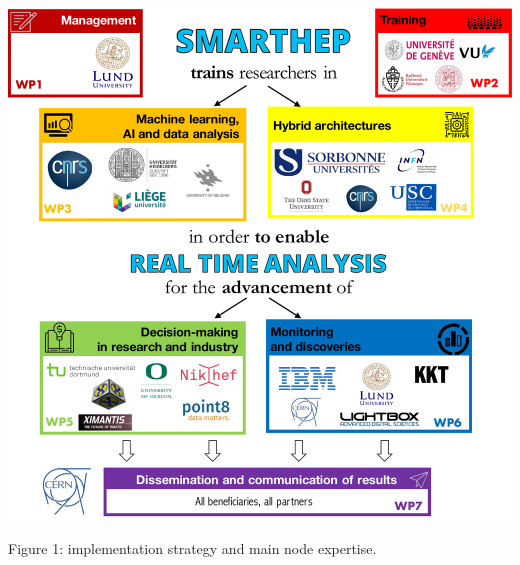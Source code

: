 \includegraphics[width=\textwidth]{figs/NetworkCompositionCombinedImplementation} %
\begin{center}\footnotesize \label{fig:implementation}
Figure 1: \acronym implementation strategy and main node expertise.
\end{center}%
\normalsize 
\vspace{-2mm}
 
